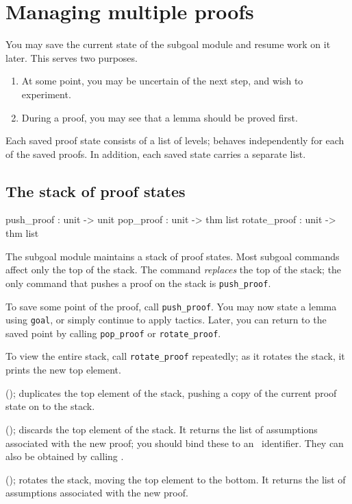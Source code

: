 \section{Managing multiple proofs}
You may save the current state of the subgoal module and resume work on it
later.  This serves two purposes.  
\begin{enumerate}
\item At some point, you may be uncertain of the next step, and
wish to experiment.

\item During a proof, you may see that a lemma should be proved first.
\end{enumerate}
Each saved proof state consists of a list of levels;  behaves
independently for each of the saved proofs.  In addition, each saved state
carries a separate  list.

\subsection{The stack of proof states}
\begin{ttbox} 
push_proof   : unit -> unit
pop_proof    : unit -> thm list
rotate_proof : unit -> thm list
\end{ttbox}
The subgoal module maintains a stack of proof states.  Most subgoal
commands affect only the top of the stack.  The  command {\em
replaces\/} the top of the stack; the only command that pushes a proof on the
stack is \texttt{push_proof}.

To save some point of the proof, call \texttt{push_proof}.  You may now
state a lemma using \texttt{goal}, or simply continue to apply tactics.
Later, you can return to the saved point by calling \texttt{pop_proof} or 
\texttt{rotate_proof}. 

To view the entire stack, call \texttt{rotate_proof} repeatedly; as it rotates
the stack, it prints the new top element.

\begin{ttdescription}
\item[\ttindexbold{push_proof}();]  
duplicates the top element of the stack, pushing a copy of the current
proof state on to the stack.

\item[\ttindexbold{pop_proof}();]  
discards the top element of the stack.  It returns the list of
assumptions associated with the new proof;  you should bind these to an
\ML\ identifier.  They can also be obtained by calling .

\item[\ttindexbold{rotate_proof}();]
rotates the stack, moving the top element to the bottom.  It returns the
list of assumptions associated with the new proof.
\end{ttdescription}


